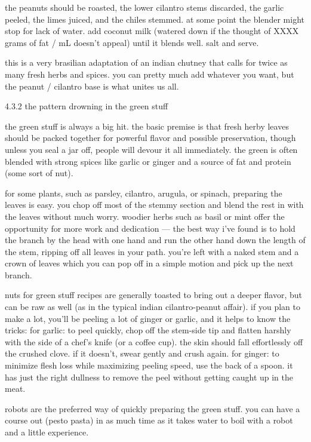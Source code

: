 the peanuts should be roasted, the lower cilantro stems discarded, the garlic peeled, the limes juiced, and the chiles stemmed. at some point the blender might stop for lack of water. add coconut milk (watered down if the thought of XXXX grams of fat / mL doesn't appeal) until it blends well. salt and serve.

this is a very brasilian adaptation of an indian chutney that calls for twice as many fresh herbs and spices. you can pretty much add whatever you want, but the peanut / cilantro base is what unites us all.

4.3.2 the pattern drowning in the green stuff

the green stuff is always a big hit. the basic premise is that fresh herby leaves should be packed together for powerful flavor and possible preservation, though unless you seal a jar off, people will devour it all immediately. the green is often blended with strong spices like garlic or ginger and a source of fat and protein (some sort of nut).

for some plants, such as parsley, cilantro, arugula, or spinach, preparing the leaves is easy. you chop off most of the stemmy section and blend the rest in with the leaves without much worry. woodier herbs such as basil or mint offer the opportunity for more work and dedication --- the best way i've found is to hold the branch by the head with one hand and run the other hand down the length of the stem, ripping off all leaves in your path. you're left with a naked stem and a crown of leaves which you can pop off in a simple motion and pick up the next branch.

nuts for green stuff recipes are generally toasted to bring out a deeper flavor, but can be raw as well (as in the typical indian cilantro-peanut affair). if you plan to make a lot, you'll be peeling a lot of ginger or garlic, and it helps to know the tricks:
	for garlic: to peel quickly, chop off the stem-side tip and flatten harshly with the side of a chef's knife (or a coffee cup). the skin should fall effortlessly off the crushed clove. if it doesn't, swear gently and crush again.
	for ginger: to minimize flesh loss while maximizing peeling speed, use the back of a spoon. it has just the right dullness to remove the peel without getting caught up in the meat.

robots are the preferred way of quickly preparing the green stuff. you can have a course out (pesto pasta) in as much time as it takes water to boil with a robot and a little experience.


